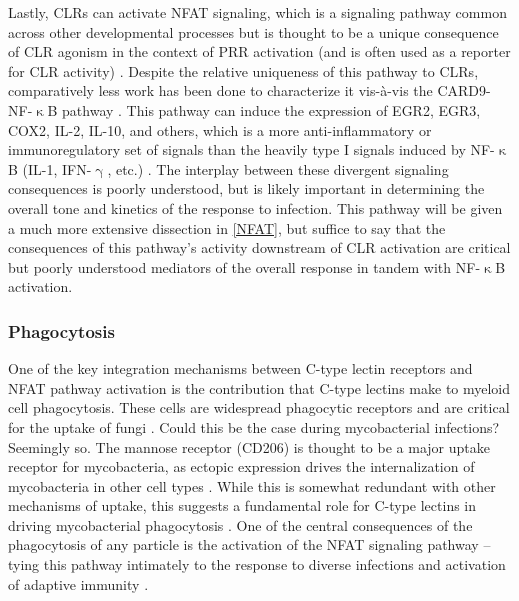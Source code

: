 Lastly, CLRs can activate NFAT signaling, which is a signaling pathway common across other developmental processes but is thought to be a unique consequence of CLR agonism in the context of PRR activation (and is often used as a reporter for CLR activity) \citep{Wilkins2004, Chow1999, Jauliac2002, Aramburu1998, HannantaAnan2016, Hooijberg2000, Goodridge2007, Goodridge2008, Bendickova2020, Fuller2007, Zhao2014}. Despite the relative uniqueness of this pathway to CLRs, comparatively less work has been done to characterize it vis\hyp{}\`{a}\hyp{}vis the CARD9\hyp{}NF\hyp{}$\upkappa$B pathway \citep{Goodridge2007, Goodridge2009, Deerhake2021}. This pathway can induce the expression of EGR2, EGR3, COX2, IL\hyp{}2, IL\hyp{}10, and others, which is a more anti\hyp{}inflammatory or immunoregulatory set of signals than the heavily type I signals induced by NF\hyp{}$\upkappa$B (IL\hyp{}1, IFN\hyp{}$\upgamma$, etc.) \citep{Saraiva2010}. The interplay between these divergent signaling consequences is poorly understood, but is likely important in determining the overall tone and kinetics of the response to infection. This pathway will be given a much more extensive dissection in \autoref{NFAT}, but suffice to say that the consequences of this pathway's activity downstream of CLR activation are critical but poorly understood mediators of the overall response in tandem with NF\hyp{}$\upkappa$B activation.

\subsubsection{Phagocytosis}

One of the key integration mechanisms between C\hyp{}type lectin receptors and NFAT pathway activation is the contribution that C\hyp{}type lectins make to myeloid cell phagocytosis. These cells are widespread phagocytic receptors and are critical for the uptake of fungi \citep{Robinson2006}. Could this be the case during mycobacterial infections? Seemingly so. The mannose receptor (CD206) is thought to be a major uptake receptor for mycobacteria, as ectopic expression drives the internalization of mycobacteria in other cell types \citep{Schlesinger1993}. While this is somewhat redundant with other mechanisms of uptake, this suggests a fundamental role for C\hyp{}type lectins in driving mycobacterial phagocytosis \citep{Ernst1998}. One of the central consequences of the phagocytosis of any particle is the activation of the NFAT signaling pathway -- tying this pathway intimately to the response to diverse infections and activation of adaptive immunity \citep{Khameneh2017}. 

